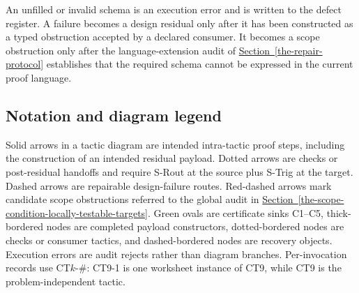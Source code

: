 \documentclass[
  11pt,
]{article}
\theoremstyle{definition}
\newcommand{\secref}[1]{\hyperref[#1]{Section~\ref*{#1}}}
\begin{document}
An unfilled or invalid schema is an execution error and is written to the
defect register. A failure becomes a design residual only after it has
been constructed as a typed obstruction accepted by a declared consumer.
It becomes a scope obstruction only after the language-extension audit of
\secref{the-repair-protocol} establishes that the required schema cannot
be expressed in the current proof language.

\subsection{Notation and diagram legend}\label{data-notation-legend}
Solid arrows in a tactic diagram are intended intra-tactic proof steps,
including the construction of an intended residual payload.  Dotted
arrows are checks or post-residual handoffs and require S-Rout at the
source plus S-Trig at the target.  Dashed arrows are repairable
design-failure routes. Red-dashed arrows mark candidate scope
obstructions referred to the global audit in
\secref{the-scope-condition-locally-testable-targets}. Green
ovals are certificate sinks C1--C5, thick-bordered nodes are completed
payload constructors, dotted-bordered nodes are checks or consumer
tactics, and dashed-bordered nodes are recovery objects.  Execution
errors are audit rejects rather than diagram branches.  Per-invocation
records use CT\(k\)-\(\#\): CT9-1 is one worksheet instance of CT9,
while CT9 is the problem-independent tactic.
\end{document}
